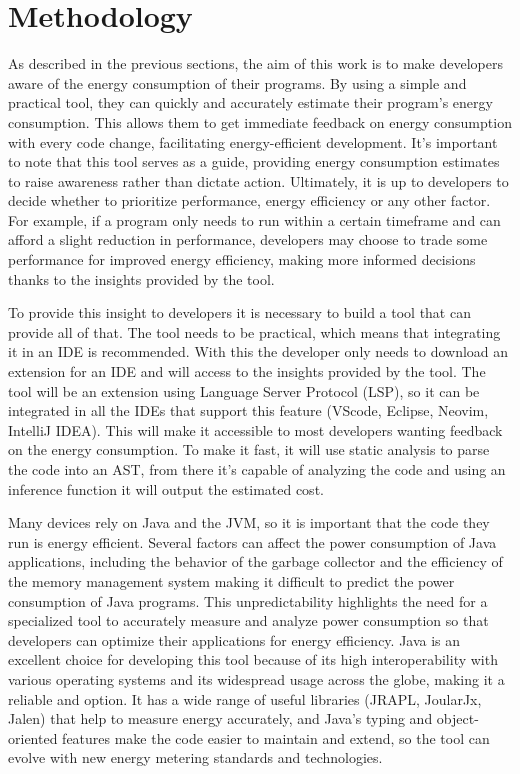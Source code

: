 \chapter{Methodology}\label{chapter:methodology}

As described in the previous sections, the aim of this work is to make developers aware of the energy consumption of their programs. By using a simple and practical tool, they can quickly and accurately estimate their program's energy consumption. This allows them to get immediate feedback on energy consumption with every code change, facilitating energy-efficient development. It's important to note that this tool serves as a guide, providing energy consumption estimates to raise awareness rather than dictate action. Ultimately, it is up to developers to decide whether to prioritize performance, energy efficiency or any other factor. For example, if a program only needs to run within a certain timeframe and can afford a slight reduction in performance, developers may choose to trade some performance for improved energy efficiency, making more informed decisions thanks to the insights provided by the tool.

To provide this insight to developers it is necessary to build a tool that can provide all of that. The tool needs to be practical, which means that integrating it in an IDE is recommended. With this the developer only needs to download an extension for an IDE and will access to the insights provided by the tool.
The tool will be an extension using Language Server Protocol (LSP), so it can be integrated in all the IDEs that support this feature (VScode, Eclipse, Neovim, IntelliJ IDEA). This will make it accessible to most developers wanting feedback on the energy consumption. To make it fast, it will use static analysis to parse the code into an AST, from there it's capable of analyzing the code and using an inference function it will output the estimated cost.

Many devices rely on Java and the JVM, so it is important that the code they run is energy efficient. Several factors can affect the power consumption of Java applications, including the behavior of the garbage collector and the efficiency of the memory management system \cite{10.5555/1267847.1267870} making it difficult to predict the power consumption of Java programs. This unpredictability highlights the need for a specialized tool to accurately measure and analyze power consumption so that developers can optimize their applications for energy efficiency.
Java is an excellent choice for developing this tool because of its high interoperability with various operating systems and its widespread usage across the globe, making it a reliable and option. It has a wide range of useful libraries (JRAPL, JoularJx, Jalen) that help to measure energy accurately, and Java's typing and object-oriented features make the code easier to maintain and extend, so the tool can evolve with new energy metering standards and technologies. 

